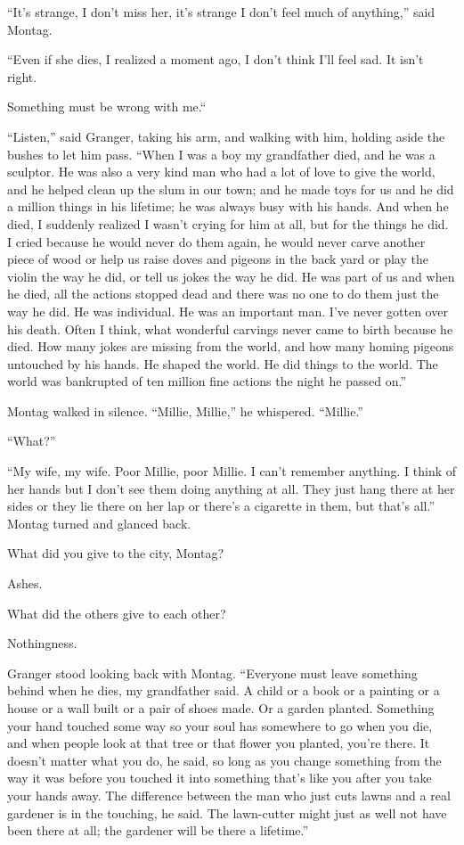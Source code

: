 \documentclass[11pt,openany]{book}
\begin{document}
``It's strange, I don't miss her, it's strange I don't feel much of anything,'' said Montag.

``Even if she dies, I realized a moment ago, I don't think I'll feel sad. It isn't right.

Something must be wrong with me.``

``Listen,'' said Granger, taking his arm, and walking with him, holding aside the bushes to let him pass. ``When I was a boy my grandfather died, and he was a sculptor. He was also a very kind man who had a lot of love to give the world, and he helped clean up the slum in our town; and he made toys for us and he did a million things in his lifetime; he was always busy with his hands. And when he died, I suddenly realized I wasn't crying for him at all, but for the things he did. I cried because he would never do them again, he would never carve another piece of wood or help us raise doves and pigeons in the back yard or play the violin the way he did, or tell us jokes the way he did. He was part of us and when he died, all the actions stopped dead and there was no one to do them just the way he did. He was individual. He was an important man. I've never gotten over his death. Often I think, what wonderful carvings never came to birth because he died. How many jokes are missing from the world, and how many homing pigeons untouched by his hands. He shaped the world. He did things to the world. The world was bankrupted of ten million fine actions the night he passed on.''

Montag walked in silence. ``Millie, Millie,'' he whispered. ``Millie.''

``What?''

``My wife, my wife. Poor Millie, poor Millie. I can't remember anything. I think of her hands but I don't see them doing anything at all. They just hang there at her sides or they lie there on her lap or there's a cigarette in them, but that's all.'' Montag turned and glanced back.

What did you give to the city, Montag?

Ashes.

What did the others give to each other?

Nothingness.

Granger stood looking back with Montag. ``Everyone must leave something behind when he dies, my grandfather said. A child or a book or a painting or a house or a wall built or a pair of shoes made. Or a garden planted. Something your hand touched some way so your soul has somewhere to go when you die, and when people look at that tree or that flower you planted, you're there. It doesn't matter what you do, he said, so long as you change something from the way it was before you touched it into something that's like you after you take your hands away. The difference between the man who just cuts lawns and a real gardener is in the touching, he said. The lawn-cutter might just as well not have been there at all; the gardener will be there a lifetime.''
\end{document}
